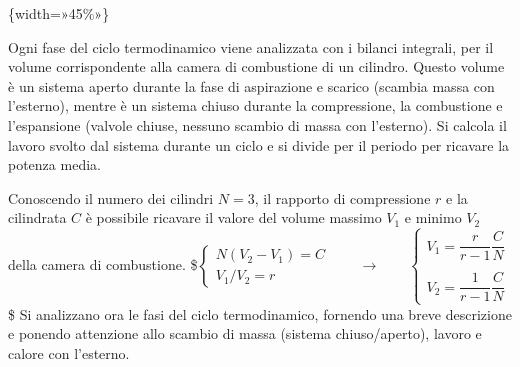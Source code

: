 \documentclass[letterpaper,10pt,italian]{jupyterBook}
\begin{document}
\sphinxAtStartPar
{}\{width=»45\%»\}

\sphinxAtStartPar
Ogni fase del ciclo termodinamico viene analizzata con i bilanci
integrali, per il volume corrispondente alla camera di combustione di un
cilindro. Questo volume è un sistema aperto durante la fase di
aspirazione e scarico (scambia massa con l’esterno), mentre è un sistema
chiuso durante la compressione, la combustione e l’espansione (valvole
chiuse, nessuno scambio di massa con l’esterno). Si calcola il lavoro
svolto dal sistema durante un ciclo e si divide per il periodo per
ricavare la potenza media.

\sphinxAtStartPar
Conoscendo il numero dei cilindri \(N=3\), il rapporto di compressione \(r\)
e la cilindrata \(C\) è possibile ricavare il valore del volume massimo
\(V_1\) e minimo \(V_2\) della camera di combustione. \$\(\begin{cases}
 N( V_2 - V_1 ) = C \\
 V_1 / V_2 = r
\end{cases} \qquad \rightarrow \qquad
\begin{cases}
 V_1 = \dfrac{r}{r-1} \dfrac{C}{N} \\ \\ 
 V_2 = \dfrac{1}{r-1} \dfrac{C}{N}
\end{cases}\)\$ Si analizzano ora le fasi del ciclo termodinamico,
fornendo una breve descrizione e ponendo attenzione allo scambio di
massa (sistema chiuso/aperto), lavoro e calore con l’esterno.
\end{document}
